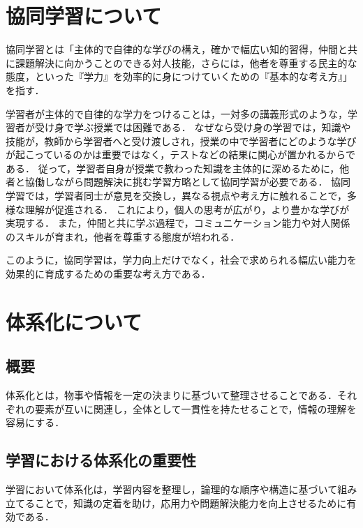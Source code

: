 \documentclass[12pt,a4j,titlepage]{ltjsarticle}
\begin{document}


\clearpage

\section{協同学習について}
協同学習とは「主体的で自律的な学びの構え，確かで幅広い知的習得，仲間と共に課題解決に向かうことのできる対人技能，さらには，他者を尊重する民主的な態度，といった『学力』を効率的に身につけていくための『基本的な考え方』」を指す．

学習者が主体的で自律的な学力をつけることは，一対多の講義形式のような，学習者が受け身で学ぶ授業では困難である．
なぜなら受け身の学習では，知識や技能が，教師から学習者へと受け渡しされ，授業の中で学習者にどのような学びが起こっているのかは重要ではなく，テストなどの結果に関心が置かれるからである．
従って，学習者自身が授業で教わった知識を主体的に深めるために，他者と協働しながら問題解決に挑む学習方略として協同学習が必要である．
協同学習では，学習者同士が意見を交換し，異なる視点や考え方に触れることで，多様な理解が促進される．
これにより，個人の思考が広がり，より豊かな学びが実現する．
また，仲間と共に学ぶ過程で，コミュニケーション能力や対人関係のスキルが育まれ，他者を尊重する態度が培われる．

このように，協同学習は，学力向上だけでなく，社会で求められる幅広い能力を効果的に育成するための重要な考え方である．

\section{体系化について}
\subsection{概要}
体系化とは，物事や情報を一定の決まりに基づいて整理させることである．それぞれの要素が互いに関連し，全体として一貫性を持たせることで，情報の理解を容易にする．

\subsection{学習における体系化の重要性}
学習において体系化は，学習内容を整理し，論理的な順序や構造に基づいて組み立てることで，知識の定着を助け，応用力や問題解決能力を向上させるために有効である．

\end{document}
